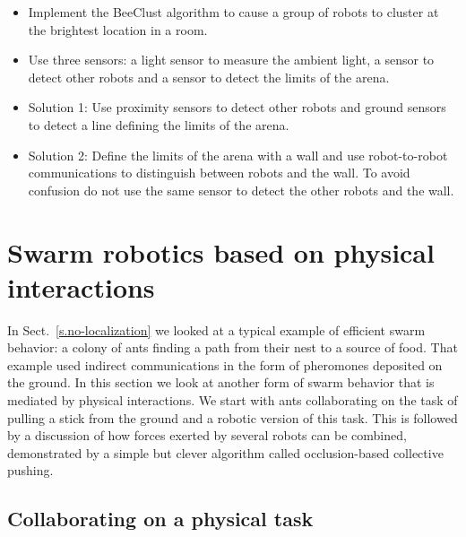 \begin{framed}
\begin{itemize}
\item Implement the BeeClust algorithm to cause a group of robots to cluster at the brightest location in a room.
\item Use three sensors: a light sensor to measure the ambient light, a sensor to detect other robots and a sensor to detect the limits of the arena.
\item Solution 1: Use proximity sensors to detect other robots and ground sensors to detect a line defining the limits of the arena.
\item Solution 2: Define the limits of the arena with a wall and use robot-to-robot communications to distinguish between robots and the wall. To avoid confusion do not use the same sensor to detect the other robots and the wall.
\end{itemize}
\end{framed}

\section{Swarm robotics based on physical interactions}\label{s.swarm-physical}

In Sect.~\ref{s.no-localization} we looked at a typical example of efficient swarm behavior: a colony of ants finding a path from their nest to a source of food. That example used indirect communications in the form of pheromones deposited on the ground. In this section we look at another form of swarm behavior that is mediated by physical interactions. We start with ants collaborating on the task of pulling a stick from the ground and a robotic version of this task. This is followed by a discussion of how forces exerted by several robots can be combined, demonstrated by a simple but clever algorithm called occlusion-based collective pushing.

\subsection{Collaborating on a physical task}

